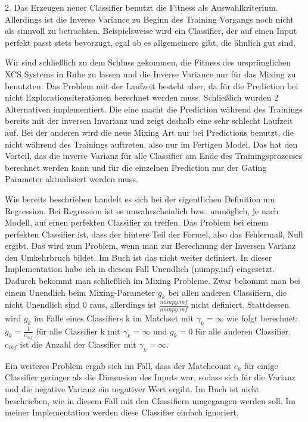 \documentclass{ocsmnar}
\begin{document}
2. Das Erzeugen neuer Classifier benutzt die Fitness als Auswahlkriterium. Allerdings ist die Inverse Variance zu Beginn des Training Vorgangs noch nicht als sinnvoll zu betrachten. Beispielsweise wird ein Classifier, der auf einen Input perfekt passt stets bevorzugt, egal ob es allgemeinere gibt, die ähnlich gut sind. 

Wir sind schließlich zu dem Schluss gekommen, die Fitness des ursprünglichen XCS Systems in Ruhe zu lassen und die Inverse Variance nur für das Mixing zu benutzten. Das Problem mit der Laufzeit besteht aber, da für die Prediction bei nicht Explorationsiterationen berechnet werden muss. Schließlich wurden 2 Alternativen implementiert. Die eine macht die Prediction während des Trainings bereits mit der inversen Invarianz und zeigt deshalb eine sehr schlecht Laufzeit auf. Bei der anderen wird die neue Mixing Art nur bei Predictions benutzt, die nicht während des Trainings auftreten, also nur im Fertigen Model. Das hat den Vorteil, das die inverse Varianz für alle Classifier am Ende des Trainingsprozesses berechnet werden kann und für die einzelnen Prediction nur der Gating Parameter aktualisiert werden muss.  
 


Wie bereits beschrieben handelt es sich bei der eigentlichen Definition um Regression. Bei Regression ist es unwahrscheinlich bzw. unmöglich, je nach Modell, auf einen perfekten Classifier zu treffen. Das Problem bei einem perfekten Classifier ist, dass der hintere Teil der Formel, also das Fehlermaß, Null ergibt. Das wird zum Problem, wenn man zur Berechnung der Inversen Varianz den Umkehrbruch bildet. Im Buch ist das nicht weiter definiert. In dieser Implementation habe ich in diesem Fall Unendlich (numpy.inf) eingesetzt. Dadurch bekommt man schließlich im Mixing Probleme. Zwar bekommt man bei einem Unendlich beim Mixing-Parameter $g_{k}$ bei allen anderen Classifiern, die nicht Unendlich sind 0 raus, allerdings ist $\frac{numpy.inf}{numpy.inf}$ nicht definiert. Stattdessen wird $g_{k}$ im Falle eines Classifiers k im Matchset mit $\gamma_{k} = \infty$ wie folgt berechnet: $g_{k} = \frac{1}{c_{inf}} $ für alle Classifier k mit $\gamma_{k} = \infty$ und $g_{k} = 0$ für alle anderen Classifier. $c_{inf}$ ist die Anzahl der Classifier mit $\gamma_{k} = \infty$.

Ein weiteres Problem ergab sich im Fall, dass der Matchcount $c_k$ für einige Classifier geringer als die Dimension des Inputs war, sodass sich für die Varianz und die negative Varianz ein negativer Wert ergibt. Im Buch ist nicht beschrieben, wie in diesem Fall mit den Classifiern umgegangen werden soll. Im meiner Implementation werden diese Classifier einfach ignoriert. 
\end{document}
